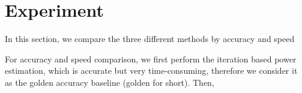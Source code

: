 \section{Experiment}
In this section, we compare the three different methods by accuracy and speed


For accuracy and speed comparison, we first perform the iteration based power estimation, which is accurate but very time-consuming, therefore we consider it as the golden accuracy baseline (golden for short). Then, 